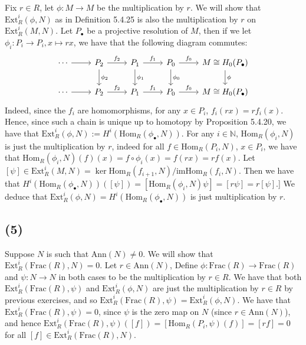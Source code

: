 \documentclass{article}
\newcommand{\Frac}{\mathrm{Frac}}
\newcommand{\Hom}[2]{\mathrm{Hom}_R(#1, #2)}
\newcommand{\Ext}{\mathrm{Ext}_R}
\newcommand{\im}{\mathrm{im}}
\newcommand{\Ann}{\mathrm{Ann}}
\begin{document}
Fix $r \in R$, let $\phi: M \to M$ be the multiplication by $r$.
We will show that $\Ext^i(\phi, N)$ as in Definition 5.4.25
is also the multiplication by $r$ on $\Ext^i(M, N)$.
Let $P_\bullet$ be a projective resolution of $M$,
then if we let $\phi_i: P_i \to P_i, x \mapsto rx$,
we have that the following diagram commutes:
\begin{equation*}
\begin{tikzcd}
\cdots \arrow[r] & P_2 \arrow[r, "f_2"] \arrow[d, "\phi_2"] & P_1 \arrow[r, "f_1"] \arrow[d, "\phi_1"] & P_0 \arrow[r, "f_0"] \arrow[d, "\phi_0"] & M\cong H_0(P_\bullet) \arrow[d, "\phi"] \\
\cdots \arrow[r] & P_2 \arrow[r, "f_2"]                     & P_1 \arrow[r, "f_1"]                     & P_0 \arrow[r, "f_0"]                     & M\cong H_0(P_\bullet)
\end{tikzcd}
\end{equation*}
Indeed, since the $f_i$ are homomorphisms, for any $x \in P_i$,
$f_i(rx) = rf_i(x)$. Hence, since such a chain is unique
up to homotopy by Proposition 5.4.20, we have that
$\Ext^i(\phi, N) := H^i(\Hom{\phi_\bullet}{N})$.
For any $i \in \mathbb{N}$, $\Hom{\phi_i}{N}$ is just the
multiplication by $r$, indeed for all $f \in \Hom{P_i}{N}$,
$x \in P_i$, we have that $\Hom{\phi_i}{N}(f)(x) = f\circ\phi_i(x)
= f(rx) = rf(x)$.
Let $[\psi] \in \Ext^i(M, N)
= \ker\Hom{f_{i+1}}{N}/\im\Hom{f_i}{N}$.
Then we have that
$H^i(\Hom{\phi_\bullet}{N})([\psi]) = [\Hom{\phi_i}{N}\psi]
= [r\psi] = r[\psi]$.]
We deduce that $\Ext^i(\phi, N) = H^i(\Hom{\phi_\bullet}{N})$
is just multiplication by $r$.

\subsection*{(5)}

Suppose $N$ is such that $\Ann(N) \neq 0$. 
We will show that $\Ext^i(\Frac(R), N) = 0$. Let $r \in \Ann(N)$,
Define $\phi: \Frac(R) \to \Frac(R)$ and $\psi: N \to N$ 
in both cases to be the multiplication by $r \in R$.
We have that both $\Ext^i(\Frac(R), \psi)$ and
$\Ext^i(\phi, N)$ are just the multiplication by $r \in R$ by
previous exercises, and so
$\Ext^i(\Frac(R), \psi) = \Ext^i(\phi, N)$.
We have that $\Ext^i(\Frac(R), \psi) = 0$, since 
$\psi$ is the zero map on $N$ (since $r\in \Ann(N)$), and hence
$\Ext^i(\Frac(R), \psi)([f]) = [\Hom{P_i}{\psi}(f)] = [rf] = 0$ for
all $[f] \in \Ext^i(\Frac(R), N)$.
\end{document}
